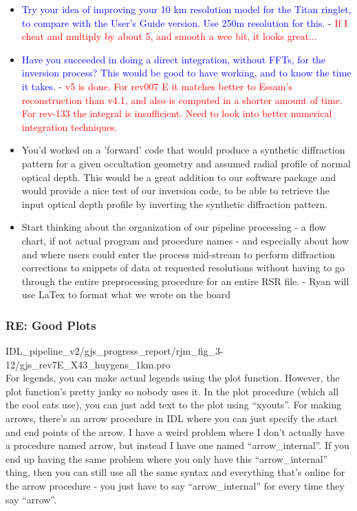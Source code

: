 \documentclass[crop=false,class=article,oneside]{standalone}
\begin{document}
\begin{itemize}
\begin{itemize}
    \end{itemize}
    \item \textcolor{blue}{Try your idea of improving your 10 km resolution model for the Titan ringlet, to compare with the User's Guide version. Use 250m resolution for this.} - \textcolor{red}{If I cheat and multiply by about 5, and smooth a wee bit, it looks great...}
    \item \textcolor{blue}{Have you succeeded in doing a direct integration, without FFTs, for the inversion process? This would be good to have working, and to know the time it takes.} - \textcolor{red}{v5 is done. For rev007 E it matches better to Essam’s reconstruction than v4.1, and also is computed in a shorter amount of time. For rev-133 the integral is insufficient. Need to look into better numerical integration techniques.}
    \item You'd worked on a 'forward' code that would produce a synthetic diffraction pattern for a given occultation geometry and assumed radial profile of normal optical depth. This would be a great addition to our software package and would provide a nice test of our inversion code, to be able to retrieve the input optical depth profile by inverting the synthetic diffraction pattern.
    \item Start thinking about the organization of our pipeline processing - a flow chart, if not actual program and procedure names - and especially about how and where users could enter the process mid-stream to perform diffraction corrections to snippets of data at requested resolutions without having to go through the entire preprocessing procedure for an entire RSR file. - Ryan will use LaTex to format what we wrote on the board
\end{itemize}
\subsubsection{\footnotesize RE: Good Plots}
IDL\_pipeline\_v2/gjs\_progress\_report/rjm\_fig\_3-12/gjs\_rev7E\_X43\_huygens\_1km.pro\\
For legends, you can make actual legends using the plot function. However, the plot function’s pretty janky so nobody uses it. In the plot procedure (which all the cool cats use), you can just add text to the plot using “xyouts”. For making arrows, there’s an arrow procedure in IDL where you can just specify the start and end points of the arrow. I have a weird problem where I don’t actually have a procedure named arrow, but instead I have one named “arrow\_internal”. If you end up having the same problem where you only have this “arrow\_internal” thing, then you can still use all the same syntax and everything that’s online for the arrow procedure - you just have to say “arrow\_internal” for every time they say “arrow”.
\end{document}

